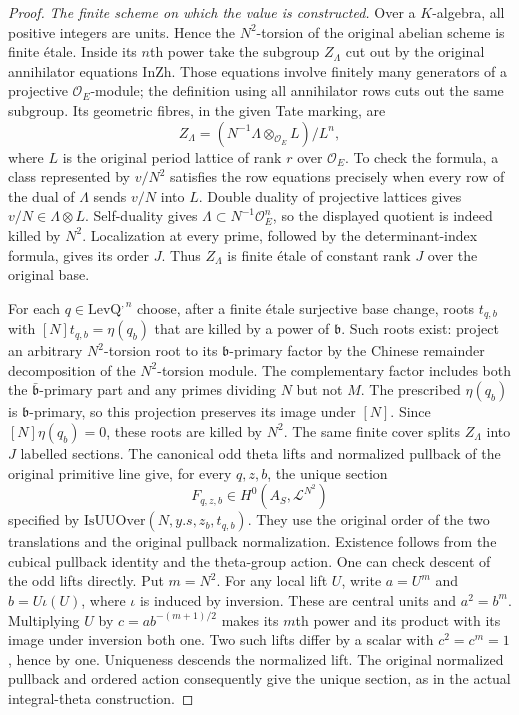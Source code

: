 \begin{proof}
\emph{The finite scheme on which the value is constructed.}
Over a $K$-algebra, all positive integers are units.  Hence the
$N^2$-torsion of the original abelian scheme is finite \'etale.
Inside its $n$th power take the subgroup $Z_\Lambda$ cut out by
the original annihilator equations $\mathrm{InZh}$.
Those equations involve finitely many generators of a projective
$\mathcal O_E$-module; the definition using all annihilator rows
cuts out the same subgroup.  Its geometric fibres, in the given
Tate marking, are
\[
 Z_\Lambda=(N^{-1}\Lambda\otimes_{\mathcal O_E}L)/L^n,
                                                        \tag{RT1}
\]
where $L$ is the original period lattice of rank $r$ over
$\mathcal O_E$.  To check the formula, a class represented by
$v/N^2$ satisfies the row equations precisely when every row of
the dual of $\Lambda$ sends $v/N$ into $L$.  Double duality of
projective lattices gives $v/N\in\Lambda\otimes L$.
Self-duality gives $\Lambda\subset N^{-1}\mathcal O_E^n$, so
the displayed quotient is indeed killed by $N^2$.
Localization at every prime, followed by the determinant-index
formula, gives its order $J$.  Thus $Z_\Lambda$ is finite \'etale
of constant rank $J$ over the original base.

For each $q\in\mathrm{LevQ}^{,n}$ choose, after a finite
\'etale surjective base change, roots $t_{q,b}$ with
$[N]t_{q,b}=\eta(q_b)$ that are killed by a power of
$\mathfrak b$.  Such roots exist: project an arbitrary
$N^2$-torsion root to its $\mathfrak b$-primary factor by the
Chinese remainder decomposition of the $N^2$-torsion module.
The complementary factor includes both the
$\bar{\mathfrak b}$-primary part and any primes dividing $N$
but not $M$.  The prescribed $\eta(q_b)$ is
$\mathfrak b$-primary, so this projection preserves its image
under $[N]$.
Since $[N]\eta(q_b)=0$, these roots are killed by $N^2$.
The same finite cover splits $Z_\Lambda$ into $J$ labelled
sections.  The canonical odd theta lifts and normalized pullback
of the original primitive line give, for every $q,z,b$, the
unique section
\[
          F_{q,z,b}\in H^0(A_S,\mathscr L^{N^2})
\]
specified by $\mathrm{IsUUOver}(N,y.s,z_b,t_{q,b})$.
They use the original order of the two translations and the
original pullback normalization.  Existence follows from the
cubical pullback identity and the theta-group action.  One can
check descent of the odd lifts directly.  Put $m=N^2$.
For any local lift $U$, write $a=U^m$ and
$b=U\iota(U)$, where $\iota$ is induced by inversion.
These are central units and $a^2=b^m$.  Multiplying $U$ by
$c=ab^{-(m+1)/2}$ makes its $m$th power and its product with
its image under inversion both one.  Two such lifts differ by a scalar
with $c^2=c^m=1$, hence by one.  Uniqueness descends the
normalized lift.  The original normalized pullback and ordered
action consequently give the unique section, as in the actual
integral-theta construction.\cite{raw-theta-source}


\end{proof}
